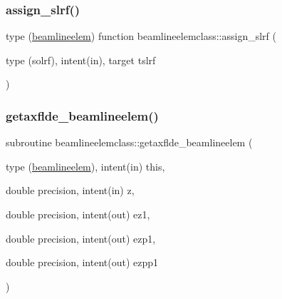 \mbox{\label{namespacebeamlineelemclass_a2ab33d7e54bdcb16b1f080eda6e520f2}} 
\subsubsection{\texorpdfstring{assign\_slrf()}{assign\_slrf()}}
{\footnotesize\ttfamily type (\mbox{\hyperlink{namespacebeamlineelemclass_structbeamlineelemclass_1_1beamlineelem}{beamlineelem}}) function beamlineelemclass\+::assign\+\_\+slrf (\begin{DoxyParamCaption}\item[{type (solrf), intent(in), target}]{tslrf }\end{DoxyParamCaption})}

\mbox{\label{namespacebeamlineelemclass_aa38d23f41bd5b34e31e784e1bb1b4ba2}} 
\subsubsection{\texorpdfstring{getaxflde\_beamlineelem()}{getaxflde\_beamlineelem()}}
{\footnotesize\ttfamily subroutine beamlineelemclass\+::getaxflde\+\_\+beamlineelem (\begin{DoxyParamCaption}\item[{type (\mbox{\hyperlink{namespacebeamlineelemclass_structbeamlineelemclass_1_1beamlineelem}{beamlineelem}}), intent(in)}]{this,  }\item[{double precision, intent(in)}]{z,  }\item[{double precision, intent(out)}]{ez1,  }\item[{double precision, intent(out)}]{ezp1,  }\item[{double precision, intent(out)}]{ezpp1 }\end{DoxyParamCaption})}

